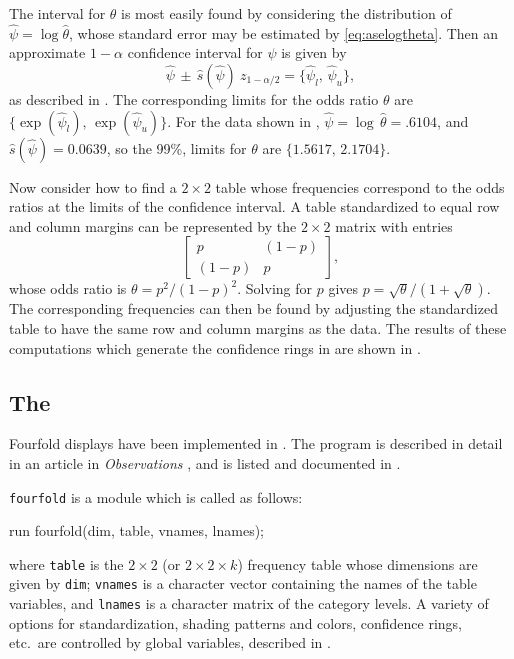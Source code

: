 The interval for \(\theta\) is most easily found by considering the
distribution of \(\hat{\psi}  =  \log  \hat{\theta} \), whose standard
error may be estimated by \eqref{eq:aselogtheta}.  Then an approximate \(1  -  \alpha\) confidence
interval for \(\psi\) is given by
\begin{equation*}
 \hat{\psi} \,\pm\,  \hat{s} ( \hat{\psi} )  \:
z_{ 1 - \alpha  / 2 } =  \{ \hat{\psi}_l , \,  \hat{\psi}_u \} 
 \comma
\end{equation*}
as described in .
The
corresponding limits for the odds ratio \(\theta\) are 
\(\{ \exp ( \hat{\psi}_l ) , \,  \exp ( \hat{\psi}_u ) \}\).  For the data
shown in , 
\(\hat{\psi}  =  \log \,  \hat{\theta} =  .6104\), 
and \(\hat{s}  ( \hat{\psi} )  =  0.0639\), so the 99\%,
limits for \(\theta\) are \(\{ 1.5617, \,  2.1704 \}\).

Now consider how to find a \(2 \times  2\) table whose frequencies
correspond to the odds ratios at the limits of the confidence
interval.  A table standardized to equal row and column margins can
be represented by the \(2 \times  2\) matrix with entries
\begin{equation*}
 \left[
  \begin{array}{cc}
   p & (1-p) \\
  (1-p) & p
  \end{array}
 \right]
 \comma
\end{equation*}
whose odds ratio is \(\theta  =  p^2 /  ( 1  -  p)^2\).  
Solving for $p$ gives \(p  =  \sqrt \theta /  ( 1  +  \sqrt \theta )\).  The
corresponding frequencies can then be found by adjusting the
standardized table to have the same row and column margins as the
data. The results of these computations which generate the confidence
rings in  are shown in .



\subsection{The }
Fourfold displays have been implemented in \IML{}.
The program is described in detail in an article in
\emph{Observations}
\citep{Friendly:94c}, and is listed and documented in
.

\texttt{fourfold} is a \IML{} module which is called as follows:
\begin{listing}
run fourfold(dim, table, vnames, lnames);
\end{listing}
where \texttt{table} is the $2 \times 2$ (or $2 \times 2 \times k$) frequency table whose dimensions are given by \texttt{dim};
\texttt{vnames} is a character vector containing the names of the table
variables, and
\texttt{lnames} is a character matrix of the category levels.
A variety of options for standardization, shading patterns and colors,
confidence rings, etc.\ are controlled by global variables,
described in .

